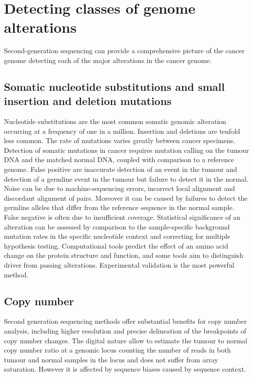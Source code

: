 \section{Detecting classes of genome alterations}
Second-generation sequencing can provide a comprehensive picture of the cancer genome detecting each of the major alterations in the cancer genome.

	\subsection{Somatic nucleotide substitutions and small insertion and deletion mutations}
	Nucleotide substitutions are the most common somatic genomic alteration occurring at a frequency of one in a million.
	Insertion and deletions are tenfold less common.
	The rate of mutations varies greatly between cancer specimens.
	Detection of somatic mutations in cancer requires mutation calling on the tumour DNA and the matched normal DNA, coupled with comparison to a reference genome.
	False positive are inaccurate detection of an event in the tumour and detection of a germline event in the tumour but failure to detect it in the normal.
	Noise can be due to machine-sequencing errors, incorrect local alignment and discordant alignment of pairs.
	Moreover it can be caused by failures to detect the germline alleles that differ from the reference sequence in the normal sample.
	False negative is often due to insufficient coverage.
	Statistical significance of an alteration can be assessed by comparison to the sample-specific background mutation rates in the specific nucleotide context and correcting for multiple hypothesis testing.
	Computational tools predict the effect of an amino acid change on the protein structure and function, and some tools aim to distinguish driver from passing alterations.
	Experimental validation is the most powerful method.

	\subsection{Copy number}
	Second generation sequencing methods offer substantial benefits for copy number analysis, including higher resolution and precise delineation of the breakpoints of copy number changes.
	The digital nature allow to estimate the tumour to normal copy number ratio at a genomic locus counting the number of reads in both tumour and normal samples in the locus and does not suffer from array saturation.
	However it is affected by sequence biases caused by sequence context.

